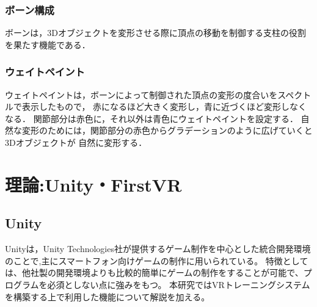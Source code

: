 \documentclass{ltjsreport}
\begin{document}
		\subsection{ボーン構成}
			ボーンは，3Dオブジェクトを変形させる際に頂点の移動を制御する支柱の役割を果たす機能である．
		\subsection{ウェイトペイント}
			ウェイトペイントは，ボーンによって制御された頂点の変形の度合いをスペクトルで表示したもので，
			赤になるほど大きく変形し，青に近づくほど変形しなくなる．
			関節部分は赤色に，それ以外は青色にウェイトペイントを設定する．
			自然な変形のためには，関節部分の赤色からグラデーションのように広げていくと3Dオブジェクトが
			自然に変形する．

\chapter{理論:Unity・FirstVR}
	\section{Unity}
		Unityは，Unity Technologies社が提供するゲーム制作を中心とした統合開発環境のことで,主にスマートフォン向けゲームの制作に用いられている。
		特徴としては、他社製の開発環境よりも比較的簡単にゲームの制作をすることが可能で、プログラムを必須としない点に強みをもつ。
		本研究ではVRトレーニングシステムを構築する上で利用した機能について解説を加える。
\end{document}
